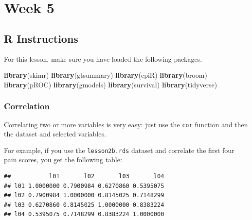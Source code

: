 \documentclass[]{book}
\newenvironment{Shaded}{\begin{snugshade}}{\end{snugshade}}
\newcommand{\KeywordTok}[1]{\textcolor[rgb]{0.13,0.29,0.53}{\textbf{#1}}}
\newcommand{\NormalTok}[1]{#1}
\newcommand{\OperatorTok}[1]{\textcolor[rgb]{0.81,0.36,0.00}{\textbf{#1}}}
\newcommand{\StringTok}[1]{\textcolor[rgb]{0.31,0.60,0.02}{#1}}
\begin{document}
\hypertarget{week-5}{%
\chapter{Week 5}\label{week-5}}

\hypertarget{r-instructions-4}{%
\section{R Instructions}\label{r-instructions-4}}

For this lesson, make sure you have loaded the following packages.

\begin{Shaded}
\begin{Highlighting}[]
\KeywordTok{library}\NormalTok{(skimr)}
\KeywordTok{library}\NormalTok{(gtsummary)}
\KeywordTok{library}\NormalTok{(epiR)}
\KeywordTok{library}\NormalTok{(broom)}
\KeywordTok{library}\NormalTok{(pROC)}
\KeywordTok{library}\NormalTok{(gmodels)}
\KeywordTok{library}\NormalTok{(survival)}
\KeywordTok{library}\NormalTok{(tidyverse)}
\end{Highlighting}
\end{Shaded}

\hypertarget{correlation}{%
\subsection{Correlation}\label{correlation}}

Correlating two or more variables is very easy: just use the \texttt{cor} function and then the dataset and selected variables.

For example, if you use the \texttt{lesson2b.rds} dataset and correlate the first four pain scores, you get the following table:

\begin{Shaded}
\end{Shaded}

\begin{verbatim}
##           l01       l02       l03       l04
## l01 1.0000000 0.7900984 0.6270860 0.5395075
## l02 0.7900984 1.0000000 0.8145025 0.7148299
## l03 0.6270860 0.8145025 1.0000000 0.8383224
## l04 0.5395075 0.7148299 0.8383224 1.0000000
\end{verbatim}
\end{document}
